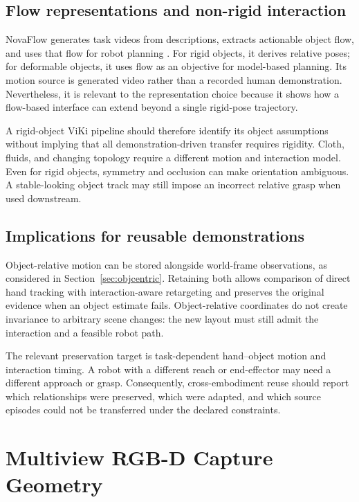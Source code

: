 \subsection{Flow representations and non-rigid interaction}

NovaFlow generates task videos from descriptions, extracts actionable object
flow, and uses that flow for robot planning \cite{novaflow}. For rigid objects,
it derives relative poses; for deformable objects, it uses flow as an objective
for model-based planning. Its motion source is generated video rather than a
recorded human demonstration. Nevertheless, it is relevant to the representation
choice because it shows how a flow-based interface can extend beyond a single
rigid-pose trajectory.

A rigid-object ViKi pipeline should therefore identify its object assumptions
without implying that all demonstration-driven transfer requires rigidity.
Cloth, fluids, and changing topology require a different motion and interaction
model. Even for rigid objects, symmetry and occlusion can make orientation
ambiguous. A stable-looking object track may still impose an incorrect
relative grasp when used downstream.

\subsection{Implications for reusable demonstrations}

Object-relative motion can be stored alongside world-frame observations, as
considered in Section~\ref{sec:objcentric}. Retaining both allows comparison
of direct hand tracking with interaction-aware retargeting and preserves the
original evidence when an object estimate fails. Object-relative coordinates
do not create invariance to arbitrary scene changes: the new layout must still
admit the interaction and a feasible robot path.

The relevant preservation target is task-dependent hand--object motion and
interaction timing. A robot with a different reach or end-effector may need a
different approach or grasp. Consequently, cross-embodiment reuse should report
which relationships were preserved, which were adapted, and which source
episodes could not be transferred under the declared constraints.

\section{Multiview RGB-D Capture Geometry}
\label{sec:lit-calib}

